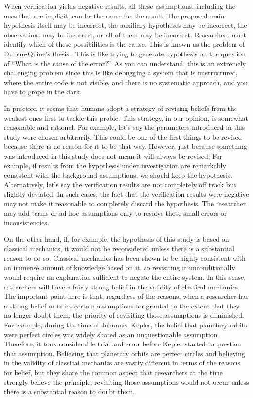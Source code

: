 When verification yields negative results, all these assumptions, including the ones that are implicit, can be the cause for the result. The proposed main hypothesis itself may be incorrect, the auxiliary hypotheses may be incorrect, the observations may be incorrect, or all of them may be incorrect. Researchers must identify which of these possibilities is the cause. This is known as the problem of Duhem-Quine's thesis \cite{sep-scientific-underdetermination}. This is like trying to generate hypothesis on the question of ``What is the cause of the error?''. As you can understand, this is an extremely challenging problem since this is like debugging a system that is unstructured, where the entire code is not visible, and there is no systematic approach, and you have to grope in the dark. 

In practice, it seems that humans adopt a strategy of revising beliefs from the weakest ones first to tackle this proble. This strategy, in our opinion, is somewhat reasonable and rational. For example, let's say the parameters introduced in this study were chosen arbitrarily. This could be one of the first things to be revised because there is no reason for it to be that way. However, just because something was introduced in this study does not mean it will always be revised. For example, if results from the hypothesis under investigation are remarkably consistent with the background assumptions, we should keep the hypothesis. Alternatively, let's say the verification results are not completely off track but slightly deviated. In such cases, the fact that the verification results were negative may not make it reasonable to completely discard the hypothesis. The researcher may add terms or ad-hoc assumptions only to resolve those small errors or inconsistencies.

On the other hand, if, for example, the hypothesis of this study is based on classical mechanics, it would not be reconsidered unless there is a substantial reason to do so. Classical mechanics has been shown to be highly consistent with an immense amount of knowledge based on it, so revisiting it unconditionally would require an explanation sufficient to negate the entire system. In this sense, researchers will have a fairly strong belief in the validity of classical mechanics. The important point here is that, regardless of the reasons, when a researcher has a strong belief or takes certain assumptions for granted to the extent that they no longer doubt them, the priority of revisiting those assumptions is diminished. For example, during the time of Johannes Kepler, the belief that planetary orbits were perfect circles was widely shared as an unquestionable assumption. Therefore, it took considerable trial and error before Kepler started to question that assumption. Believing that planetary orbits are perfect circles and believing in the validity of classical mechanics are vastly different in terms of the reasons for belief, but they share the common aspect that researchers at the time strongly believe the principle, revisiting those assumptions would not occur unless there is a substantial reason to doubt them.


